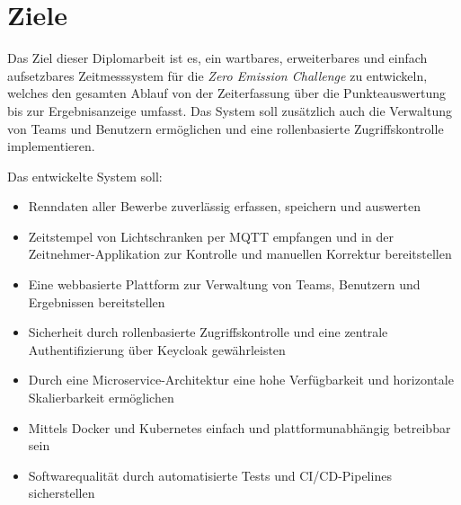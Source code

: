 
\section*{Ziele}%
\label{sec:zielsetzung}

Das Ziel dieser Diplomarbeit ist es, ein wartbares, erweiterbares und einfach 
aufsetzbares Zeitmesssystem für die \textit{Zero Emission Challenge} zu entwickeln, 
welches den gesamten Ablauf von der Zeiterfassung über die Punkteauswertung bis zur Ergebnisanzeige umfasst.
Das System soll zusätzlich auch die Verwaltung von Teams und Benutzern ermöglichen und 
eine rollenbasierte Zugriffskontrolle implementieren.

Das entwickelte System soll:
\begin{itemize}
    \item Renndaten aller Bewerbe zuverlässig erfassen, speichern und auswerten
    \item Zeitstempel von Lichtschranken per MQTT empfangen und in der 
          Zeitnehmer-Applikation zur Kontrolle und manuellen Korrektur bereitstellen
    \item Eine webbasierte Plattform zur Verwaltung von Teams, Benutzern und 
          Ergebnissen bereitstellen
    \item Sicherheit durch rollenbasierte Zugriffskontrolle und eine zentrale 
          Authentifizierung über Keycloak gewährleisten
    \item Durch eine Microservice-Architektur eine hohe Verfügbarkeit und 
          horizontale Skalierbarkeit ermöglichen
    \item Mittels Docker und Kubernetes einfach und plattformunabhängig 
          betreibbar sein
    \item Softwarequalität durch automatisierte Tests und CI/CD-Pipelines 
          sicherstellen
\end{itemize}